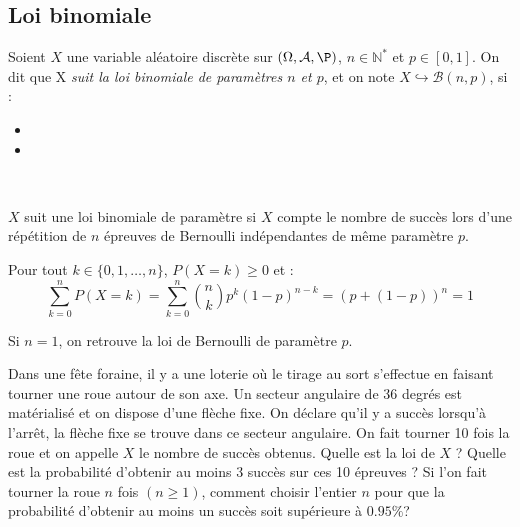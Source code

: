 \documentclass[a4paper,10pt]{report}
\begin{document}
\subsection{Loi binomiale}
%
\begin{prop}
Soient $X$ une variable aléatoire discrète sur $(\Omega, \mathcal{A},\P)$, $n \in \mathbb{N}^*$ et $p \in [0,1]$. On dit que X \textit{suit la loi binomiale de paramètres $n$ et $p$}, et on note $X \hookrightarrow \mathcal{B}(n,p)$, si :
\begin{itemize}
 \item {}
 \item {}
\end{itemize}
$\phantom{}$
\end{prop}

\begin{retenir} $X$ suit une loi binomiale de paramètre si $X$ compte le nombre de succès lors d'une répétition de $n$ épreuves de Bernoulli indépendantes de même paramètre $p$.
\end{retenir}

\begin{rems} 
\item Pour tout $k \in  \{0,1,\ldots,n\}$, $P(X=k) \geq 0$ et :
$$ \sum_{k=0}^n P(X=k) = \sum_{k=0}^n\binom nk p^k(1-p)^{n-k} = (p+(1-p))^n=1$$
\item Si $n=1$, on retrouve la loi de Bernoulli de paramètre $p$.
\end{rems}

\begin{exa} Dans une fête foraine, il y a une loterie où le tirage au sort s'effectue en faisant tourner une roue autour de son axe. Un secteur angulaire de 36 degrés est matérialisé et on dispose d'une flèche fixe. On déclare qu'il y a succès lorsqu'à l'arrêt, la flèche fixe se trouve dans ce secteur angulaire. On fait tourner 10 fois la roue et on appelle $X$ le nombre de succès obtenus. Quelle est la loi de $X$ ? Quelle est la probabilité d'obtenir au moins 3 succès sur ces 10 épreuves ? Si l'on fait tourner la roue $n$ fois $(n \geq 1)$, comment choisir l'entier $n$ pour que la probabilité d'obtenir au moins un succès soit supérieure à $0.95 \%$?
\end{exa} 
\end{document}
